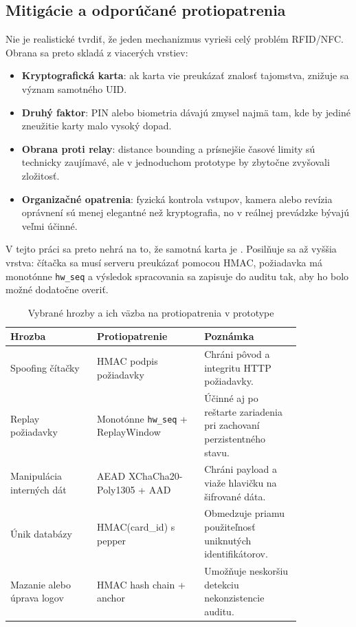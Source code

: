\documentclass[journal,a4paper,onecolumn]{IEEEtran}
\begin{document}
\subsection{Mitigácie a odporúčané protiopatrenia}

Nie je realistické tvrdiť, že jeden mechanizmus vyrieši celý problém RFID/NFC. Obrana sa preto skladá z viacerých vrstiev:

\begin{itemize}[leftmargin=*,itemsep=2pt]
  \item \textbf{Kryptografická karta}: ak karta vie preukázať znalosť tajomstva, znižuje sa význam samotného UID.
  \item \textbf{Druhý faktor}: PIN alebo biometria dávajú zmysel najmä tam, kde by jediné zneužitie karty malo vysoký dopad.
  \item \textbf{Obrana proti relay}: distance bounding a prísnejšie časové limity sú technicky zaujímavé, ale v jednoduchom prototype by zbytočne zvyšovali zložitosť.
  \item \textbf{Organizačné opatrenia}: fyzická kontrola vstupov, kamera alebo revízia oprávnení sú menej elegantné než kryptografia, no v reálnej prevádzke bývajú veľmi účinné.
\end{itemize}

V tejto práci sa preto nehrá na to, že samotná karta je . Posilňuje sa až vyššia vrstva: čítačka sa musí serveru preukázať pomocou HMAC, požiadavka má monotónne \texttt{hw\_seq} a výsledok spracovania sa zapisuje do auditu tak, aby ho bolo možné dodatočne overiť.


\begin{table}[!ht]
\centering
\caption{Vybrané hrozby a ich väzba na protiopatrenia v prototype}
\label{tab:threats_countermeasures}
\small
\begin{tabular}{p{0.25\linewidth} p{0.31\linewidth} p{0.28\linewidth}}
\toprule
\textbf{Hrozba} & \textbf{Protiopatrenie} & \textbf{Poznámka} \\
\midrule
Spoofing čítačky & HMAC podpis požiadavky & Chráni pôvod a integritu HTTP požiadavky. \\
Replay požiadavky & Monotónne \texttt{hw\_seq} + ReplayWindow & Účinné aj po reštarte zariadenia pri zachovaní perzistentného stavu. \\
Manipulácia interných dát & AEAD XChaCha20-Poly1305 + AAD & Chráni payload a viaže hlavičku na šifrované dáta. \\
Únik databázy & HMAC(card\_id) s pepper & Obmedzuje priamu použiteľnosť uniknutých identifikátorov. \\
Mazanie alebo úprava logov & HMAC hash chain + anchor & Umožňuje neskoršiu detekciu nekonzistencie auditu. \\
\bottomrule
\end{tabular}
\normalsize
\end{table}
\end{document}
